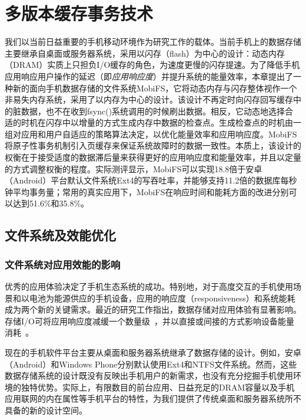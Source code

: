 \chapter{多版本缓存事务技术}
\label{chap:vct}

我们以当前日益重要的手机移动环境作为研究工作的载体。当前手机上的数据存储主要继承自桌面或服务器系统，采用以闪存（flash）为中心的设计：动态内存（DRAM）实质上只担负I/O缓存的角色，为速度更慢的闪存提速。为了降低手机应用响应用户操作的延迟（即\emph{应用响应度}）并提升系统的能量效率，本章提出了一种新的面向手机数据存储的文件系统MobiFS，它将动态内存与闪存整体视作一个非易失内存系统，采用了以内存为中心的设计。该设计不再定时向闪存回写缓存中的脏数据，也不在收到fsync()系统调用的时候刷出数据。相反，它动态地选择合适的时机在闪存中以增量的方式生成内存中数据的检查点。生成检查点的时机由一组对应用和用户自适应的策略算法决定，以优化能量效率和应用响应度。MobiFS将原子性事务机制引入页缓存来保证系统故障时的数据一致性。本质上，该设计的权衡在于接受适度的数据滞后量来获得更好的应用响应度和能量效率，并且以定量的方式调整权衡的程度。实际测评显示，MobiFS可以实现18.8倍于安卓（Android）平台默认文件系统Ext4的写吞吐率，并能够支持11.2倍的数据库每秒钟平均事务量；常用的真实应用下，MobiFS在响应时间和能耗方面的改进分别可以达到51.6\%和35.8\%。

\section{文件系统及效能优化}

\subsection{文件系统对应用效能的影响}

优秀的应用体验决定了手机生态系统的成功。特别地，对于高度交互的手机使用场景和以电池为能源供应的手机设备，应用的响应度（responsiveness）和系统能耗成为两个新的关键需求。最近的研究工作指出，数据存储对应用体验有显著影响。存储I/O可将应用响应度减缓一个数量级~\cite{Desnoyers:2013:SRN:2534861.2534867, Kim:RSS:2012,Lee:2012:SLD:2380356.2380367, Nguyen:2014:ISR:2638728.2638841}，并以直接或间接的方式影响设备能量消耗~\cite{Li:2014:EOM:2591305.2591316,Nguyen:2013:SSE:2493432.2493505,
Xu:2013:OBE:2462456.2464444}。

现在的手机软件平台主要从桌面和服务器系统继承了数据存储的设计。例如，安卓（Android）和Windows Phone分别默认使用Ext4和NTFS文件系统。然而，这些数据存储系统的设计既没有反映出手机用户的新需求，也没有充分挖掘手机使用环境的独特优势。实际上，有限数目的前台应用、日益充足的DRAM容量以及手机应用联网的内在属性等手机平台的特性，为我们提供了传统桌面和服务器系统所不具备的新的设计空间。

